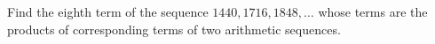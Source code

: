 Find the eighth term of the sequence $1440,1716,1848,\dots$ whose terms are the products of corresponding terms of two arithmetic sequences.

